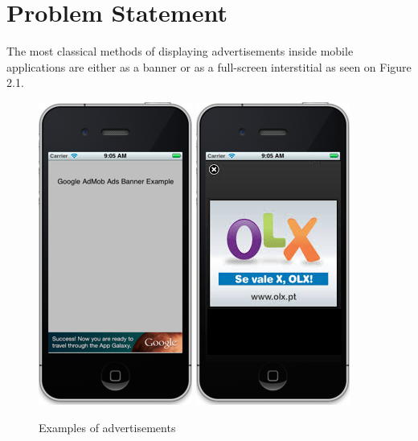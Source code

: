 
\chapter{Problem Statement} %


The most classical methods of displaying advertisements inside mobile applications are either as a banner or as a full-screen interstitial as seen on Figure 2.1.

\begin{figure}
\begin{center}
\includegraphics{Images/banner.png}
\includegraphics{Images/fullscreen.png}
\caption{Examples of advertisements \cite{http://2.bp.blogspot.com/-23YwcQCTuDk/TvEP53kzv4I/AAAAAAAAAFU/dIN9DY-ufm8/s1600/ScreenBshot2011-12-20at2.43.51PM.png} \cite{http://i.stack.imgur.com/DnVYL.png}}
\end{center}
\end{figure}

